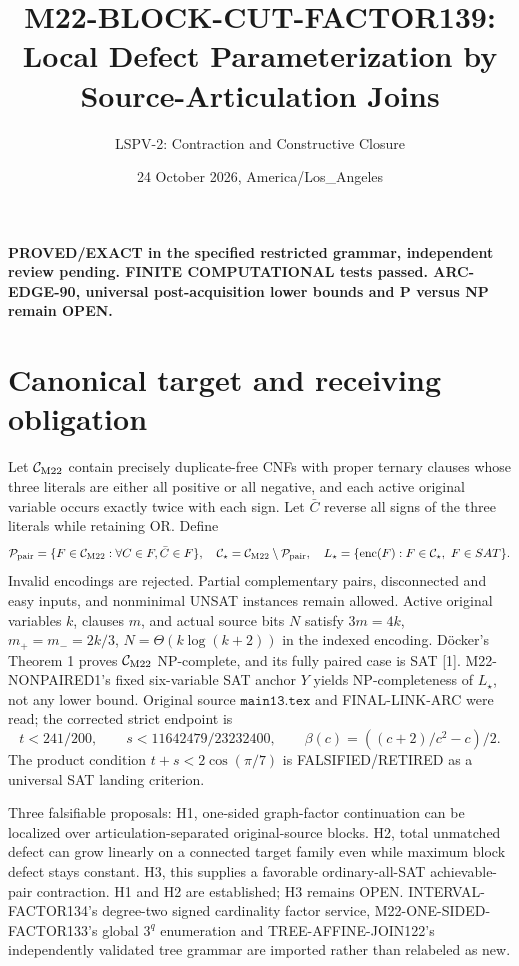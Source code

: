 \documentclass[11pt]{article}
\title{M22-BLOCK-CUT-FACTOR139: Local Defect Parameterization by Source-Articulation Joins}
\author{LSPV-2: Contraction and Constructive Closure}
\date{24 October 2026, America/Los\_Angeles}
\begin{document}
\maketitle
\begin{center}\textbf{PROVED/EXACT in the specified restricted grammar, independent review pending. FINITE COMPUTATIONAL tests passed. ARC-EDGE-90, universal post-acquisition lower bounds and P versus NP remain OPEN.}\end{center}

\section{Canonical target and receiving obligation}
Let $\mathcal C_{\rm M22}$ contain precisely duplicate-free CNFs with proper ternary clauses whose three literals are either all positive or all negative, and each active original variable occurs exactly twice with each sign. Let $\bar C$ reverse all signs of the three literals while retaining OR. Define
\[
\mathcal P_{\rm pair}=\{F\in\mathcal C_{\rm M22}:\forall C\in F,\bar C\in F\},\quad
\mathcal C_\star=\mathcal C_{\rm M22}\setminus\mathcal P_{\rm pair},\quad
L_\star=\{\operatorname{enc}(F):F\in\mathcal C_\star,\ F\in SAT\}.
\]
Invalid encodings are rejected. Partial complementary pairs, disconnected and easy inputs, and nonminimal UNSAT instances remain allowed. Active original variables $k$, clauses $m$, and actual source bits $N$ satisfy $3m=4k$, $m_+=m_-=2k/3$, $N=\Theta(k\log(k+2))$ in the indexed encoding. D\"ocker's Theorem 1 proves $\mathcal C_{\rm M22}$ NP-complete, and its fully paired case is SAT [1]. M22-NONPAIRED1's fixed six-variable SAT anchor $Y$ yields NP-completeness of $L_\star$, not any lower bound. Original source $\texttt{main13.tex}$ and FINAL-LINK-ARC were read; the corrected strict endpoint is
\[
t<241/200,\qquad s<11642479/23232400,\qquad \beta(c)=((c+2)/c^2-c)/2.
\]
The product condition $t+s<2\cos(\pi/7)$ is FALSIFIED/RETIRED as a universal SAT landing criterion.

Three falsifiable proposals: H1, one-sided graph-factor continuation can be localized over articulation-separated original-source blocks. H2, total unmatched defect can grow linearly on a connected target family even while maximum block defect stays constant. H3, this supplies a favorable ordinary-all-SAT achievable-pair contraction. H1 and H2 are established; H3 remains OPEN. INTERVAL-FACTOR134's degree-two signed cardinality factor service, M22-ONE-SIDED-FACTOR133's global $3^q$ enumeration and TREE-AFFINE-JOIN122's independently validated tree grammar are imported rather than relabeled as new.
\end{document}
